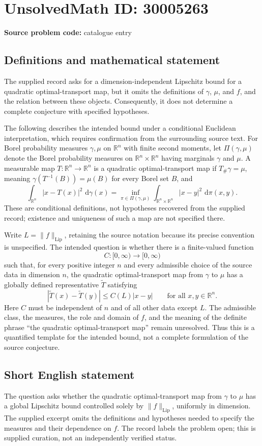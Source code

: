 \documentclass[11pt]{article}
\newcommand{\R}{\mathbb{R}}
\newcommand{\dd}{\,\mathrm{d}}
\begin{document}
\section*{UnsolvedMath ID: 30005263}
\textbf{Source problem code:} catalogue entry
\subsection{Definitions and mathematical statement}
The supplied record asks for a dimension-independent Lipschitz bound for a quadratic optimal-transport map, but it omits the definitions of \(\gamma\), \(\mu\), and \(f\), and the relation between these objects. Consequently, it does not determine a complete conjecture with specified hypotheses.

The following describes the intended bound under a conditional Euclidean interpretation, which requires confirmation from the surrounding source text. For Borel probability measures \(\gamma,\mu\) on \(\R^n\) with finite second moments, let \(\Pi(\gamma,\mu)\) denote the Borel probability measures on \(\R^n\times\R^n\) having marginals \(\gamma\) and \(\mu\). A measurable map \(T\colon\R^n\to\R^n\) is a quadratic optimal-transport map if \(T_{\#}\gamma=\mu\), meaning \(\gamma(T^{-1}(B))=\mu(B)\) for every Borel set \(B\), and
\[
\int_{\R^n}|x-T(x)|^2\,\dd\gamma(x)
=\inf_{\pi\in\Pi(\gamma,\mu)}\int_{\R^n\times\R^n}|x-y|^2\,\dd\pi(x,y).
\]
These are conditional definitions, not hypotheses recovered from the supplied record; existence and uniqueness of such a map are not specified there.

Write \(L=\|f\|_{\mathrm{Lip}}\), retaining the source notation because its precise convention is unspecified. The intended question is whether there is a finite-valued function
\[
C\colon[0,\infty)\longrightarrow[0,\infty)
\]
such that, for every positive integer \(n\) and every admissible choice of the source data in dimension \(n\), the quadratic optimal-transport map from \(\gamma\) to \(\mu\) has a globally defined representative \(\widetilde T\) satisfying
\[
|\widetilde T(x)-\widetilde T(y)|\le C(L)|x-y|
\qquad\text{for all }x,y\in\R^n.
\]
Here \(C\) must be independent of \(n\) and of all other data except \(L\). The admissible class, the measures, the role and domain of \(f\), and the meaning of the definite phrase ``the quadratic optimal-transport map'' remain unresolved. Thus this is a quantified template for the intended bound, not a complete formulation of the source conjecture.
\subsection{Short English statement}
The question asks whether the quadratic optimal-transport map from \(\gamma\) to \(\mu\) has a global Lipschitz bound controlled solely by \(\|f\|_{\mathrm{Lip}}\), uniformly in dimension. The supplied excerpt omits the definitions and hypotheses needed to specify the measures and their dependence on \(f\). The record labels the problem open; this is supplied curation, not an independently verified status.
\end{document}

